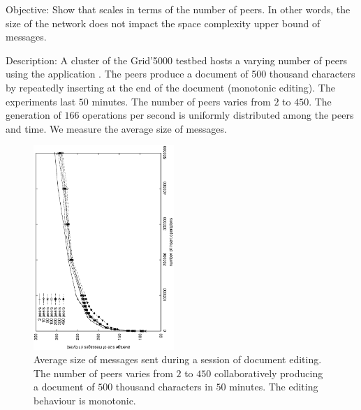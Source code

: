 \begin{asparadesc}
\item [Objective:] Show that \EDITORNAME{} scales in terms of the number of
  peers. In other words, the size of the network does not impact the space
  complexity upper bound of messages.
\item [Description:] A cluster of the Grid'5000 testbed hosts a varying number
  of peers using the application \EDITORNAME{}. The peers produce a
  document of 500 thousand characters by repeatedly inserting at the end of the
  document (monotonic editing). The experiments last $50$ minutes. The number
  of peers varies from $2$ to $450$. The generation of $166$ operations
  per second is uniformly distributed among the peers and time. We measure the
  average size of messages.

\begin{figure}
  \centering
  \includegraphics[angle=-90,width=0.475\textwidth]{./img/scalability.eps}
  \caption{\label{fig:scalability}Average size of messages sent during a
    session of document editing. The number of peers varies from $2$ to $450$
    collaboratively producing a document of $500$ thousand characters in $50$
    minutes. The editing behaviour is monotonic.}
\end{figure}


\end{asparadesc}

